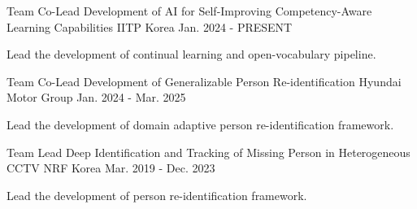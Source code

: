 

\begin{cventries}

  \cventry
    {Team Co-Lead} %
    {Development of AI for Self-Improving Competency-Aware Learning Capabilities} %
    {IITP Korea} %
    {Jan. 2024 - PRESENT} %
    {
      \begin{cvitems} %
        \item {Lead the development of continual learning and open-vocabulary pipeline.}
      \end{cvitems}
    }

  \cventry
    {Team Co-Lead} %
    {Development of Generalizable Person Re-identification} %
    {Hyundai Motor Group} %
    {Jan. 2024 - Mar. 2025} %
    {
      \begin{cvitems} %
        \item {Lead the development of domain adaptive person re-identification framework.}
      \end{cvitems}
    }

  \cventry
    {Team Lead} %
    {Deep Identification and Tracking of Missing Person in Heterogeneous CCTV} %
    {NRF Korea} %
    {Mar. 2019 - Dec. 2023} %
    {
      \begin{cvitems} %
        \item {Lead the development of person re-identification framework.}
      \end{cvitems}
    }


\end{cventries}
